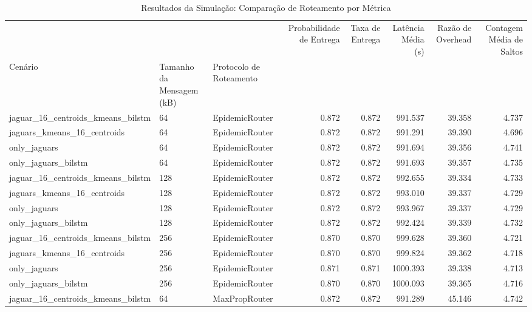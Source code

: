 \begin{table}
\caption{Resultados da Simulação: Comparação de Roteamento por Métrica}
\label{tab:resultados_roteamento}
\begin{tabular}{lllrrrrr}
\toprule
 &  &  & Probabilidade de Entrega & Taxa de Entrega & Latência Média (s) & Razão de Overhead & Contagem Média de Saltos \\
Cenário & Tamanho da Mensagem (kB) & Protocolo de Roteamento &  &  &  &  &  \\
\midrule
jaguar_16_centroids_kmeans_bilstm & 64 & EpidemicRouter & 0.872 & 0.872 & 991.537 & 39.358 & 4.737 \\
\cline{1-8} \cline{2-8} \cline{3-8}
jaguars_kmeans_16_centroids & 64 & EpidemicRouter & 0.872 & 0.872 & 991.291 & 39.390 & 4.696 \\
\cline{1-8} \cline{2-8} \cline{3-8}
only_jaguars & 64 & EpidemicRouter & 0.872 & 0.872 & 991.694 & 39.356 & 4.741 \\
\cline{1-8} \cline{2-8} \cline{3-8}
only_jaguars_bilstm & 64 & EpidemicRouter & 0.872 & 0.872 & 991.693 & 39.357 & 4.735 \\
\cline{1-8} \cline{2-8} \cline{3-8}
jaguar_16_centroids_kmeans_bilstm & 128 & EpidemicRouter & 0.872 & 0.872 & 992.655 & 39.334 & 4.733 \\
\cline{1-8} \cline{2-8} \cline{3-8}
jaguars_kmeans_16_centroids & 128 & EpidemicRouter & 0.872 & 0.872 & 993.010 & 39.337 & 4.729 \\
\cline{1-8} \cline{2-8} \cline{3-8}
only_jaguars & 128 & EpidemicRouter & 0.872 & 0.872 & 993.967 & 39.337 & 4.729 \\
\cline{1-8} \cline{2-8} \cline{3-8}
only_jaguars_bilstm & 128 & EpidemicRouter & 0.872 & 0.872 & 992.424 & 39.339 & 4.732 \\
\cline{1-8} \cline{2-8} \cline{3-8}
jaguar_16_centroids_kmeans_bilstm & 256 & EpidemicRouter & 0.870 & 0.870 & 999.628 & 39.360 & 4.721 \\
\cline{1-8} \cline{2-8} \cline{3-8}
jaguars_kmeans_16_centroids & 256 & EpidemicRouter & 0.870 & 0.870 & 999.824 & 39.362 & 4.718 \\
\cline{1-8} \cline{2-8} \cline{3-8}
only_jaguars & 256 & EpidemicRouter & 0.871 & 0.871 & 1000.393 & 39.338 & 4.713 \\
\cline{1-8} \cline{2-8} \cline{3-8}
only_jaguars_bilstm & 256 & EpidemicRouter & 0.870 & 0.870 & 1000.093 & 39.365 & 4.716 \\
\cline{1-8} \cline{2-8} \cline{3-8}
jaguar_16_centroids_kmeans_bilstm & 64 & MaxPropRouter & 0.872 & 0.872 & 991.289 & 45.146 & 4.742 \\

\end{tabular}
\end{table}
